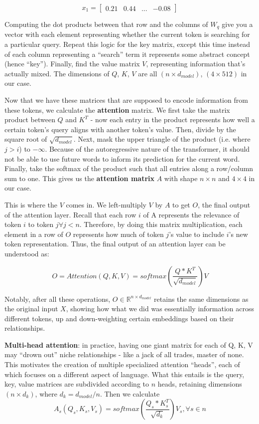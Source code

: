 \documentclass[12pt]{article}
\begin{document}
\[x_1 = \begin{bmatrix}
0.21 & 0.44 & ... & -0.08
\end{bmatrix}\]

Computing the dot products between that row and the columns of $W_q$ give you a vector with each element representing whether the current token is searching for a particular query. Repeat this logic for the key matrix, except this time instead of each column representing a \enquote{search} term it represents some abstract concept (hence \enquote{key}). Finally, find the value matrix $V$, representing information that's actually mixed. The dimensions of $Q$, $K$, $V$ are all $(n \times d_{model})$, $(4 \times 512)$ in our case.

Now that we have these matrices that are supposed to encode information from these tokens, we calculate the \textbf{attention} matrix. We first take the matrix product between $Q$ and $K^T$ - now each entry in the product represents how well a certain token's query aligns with another token's value. Then, divide by the square root of $\sqrt{d_{model}}$. Next, mask the upper triangle of the product (i.e. where $j > i$) to $-\infty$. Because of the autoregressive nature of the transformer, it should not be able to use future words to inform its prediction for the current word. Finally, take the softmax of the product such that all entries along a row/column sum to one. This gives us the \textbf{attention matrix} $A$ with shape $n \times n$ and $4 \times 4$ in our case. 

This is where the $V$ comes in. We left-multiply $V$ by $A$ to get $O$, the final output of the attention layer. Recall that each row $i$ of A represents the relevance of token $i$ to token $j \forall j<n$. Therefore, by doing this matrix multiplication, each element in a row of $O$ represents how much of token $j$'s value to include $i$'s new token representation. Thus, the final output of an attention layer can be understood as:

\[O = Attention(Q, K, V) = softmax(\frac{Q*K^T}{\sqrt{d_{model}}})V\]

Notably, after all these operations, $O \in \mathbb{R}^{n \times d_{model}}$ retains the same dimensions as the original input $X$, showing how what we did was essentially information across different tokens, up and down-weighting certain embeddings based on their relationships. 

\textbf{Multi-head attention}: in practice, having one giant matrix for each of Q, K, V may \enquote{drown out} niche relationships - like a jack of all trades, master of none. This motivates the creation of multiple specialized attention \enquote{heads}, each of which focuses on a different aspect of language. What this entails is the query, key, value matrices are subdivided according to $n$ heads, retaining dimensions $(n \times d_k)$, where $d_k=d_{model}/n$. Then we calculate \[A_s(Q_s, K_s, V_s)= softmax(\frac{Q_s*K_s^T}{\sqrt{d_k}})V_s, \forall s \in n\]
\end{document}
